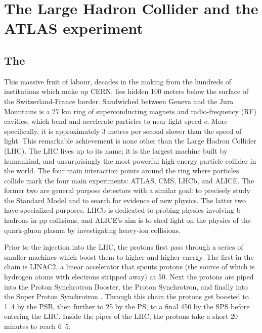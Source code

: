 \chapter{The Large Hadron Collider and the ATLAS experiment}
\label{chap:ATLASdetector}
\section{The \LHC}
\label{sec:LHC}

This massive fruit of labour, decades in the making from the hundreds of institutions which make up CERN, lies hidden 100 meters below the surface of the Switzerland-France border. Sandwiched between Geneva and the Jura Mountains is a 27 km ring of superconducting magnets and radio-frequency (RF) cavities, which bend and accelerate particles to near light speed $c$. More specifically, it is approximately 3 metres per second slower than the speed of light. This remarkable achievement is none other than the Large Hadron Collider (LHC). The LHC lives up to its name; it is the largest machine built by humankind, and unsurprisingly the most powerful high-energy particle collider in the world. The four main interaction points around the ring where particles collide mark the four main experiments: ATLAS, CMS, LHCb, and ALICE. The former two are general purpose detectors with a similar goal: to precisely study the Standard Model and to search for evidence of new physics. The latter two have specialized purposes. LHCb is dedicated to probing physics involving b-hadrons in pp collisions, and ALICE’s aim is to shed light on the physics of the quark-gluon plasma by investigating heavy-ion collisions. 

Prior to the injection into the LHC, the protons first pass through a series of smaller machines which boost them to higher and higher energy. The first in the chain is LINAC2, a linear accelerator that spouts protons (the source of which is hydrogen atoms with electrons stripped away) at \unit{50}{\MeV}. Next the protons are piped into the Proton Synchrotron Booster, the Proton Synchrotron, and finally into the Super Proton Synchrotron . Through this chain the protons get boosted to \unit{1.4}{\GeV} by the PSB, then further to \unit{25}{\GeV} by the PS, to a final \unit{450}{\GeV} by the SPS before entering the LHC. Inside the pipes of the LHC, the protons take a short 20 minutes to reach \unit{6.5}{\TeV}. 

